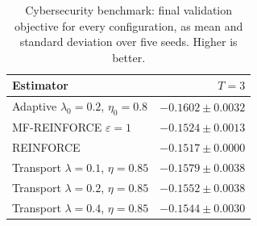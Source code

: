 \begin{table}[H]
\centering
\begin{tabular}{lr}
\toprule
Estimator & $T=3$ \\
\midrule
Adaptive $\lambda_0=0.2$, $\eta_0=0.8$ & $-0.1602\pm0.0032$ \\
MF-REINFORCE $\varepsilon=1$ & $-0.1524\pm0.0013$ \\
REINFORCE & $-0.1517\pm0.0000$ \\
Transport $\lambda=0.1$, $\eta=0.85$ & $-0.1579\pm0.0038$ \\
Transport $\lambda=0.2$, $\eta=0.85$ & $-0.1552\pm0.0038$ \\
Transport $\lambda=0.4$, $\eta=0.85$ & $-0.1544\pm0.0030$ \\
\bottomrule
\end{tabular}
\caption{Cybersecurity benchmark: final validation objective for every configuration, as mean and standard deviation over five seeds. Higher is better.}
\label{tab:full-objectives-cybersecurity}
\end{table}
